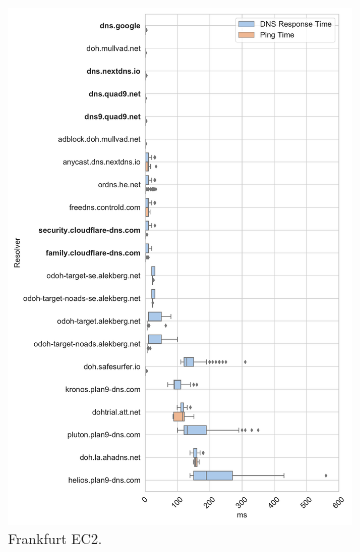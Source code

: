 \begin{figure}[h!]
\begin{subfigure}[b]{0.35\textwidth}
\includegraphics[width=\textwidth]{figures/frankfurt_NA.pdf}
    \caption{Frankfurt EC2.}
\end{subfigure}
%
\begin{subfigure}[b]{0.35\textwidth}

\end{subfigure}
\end{figure}
